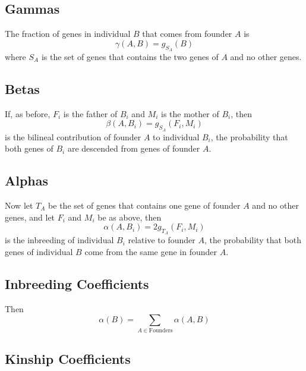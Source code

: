 \documentclass[11pt]{article}
\begin{document}
\subsection{Gammas}

The fraction of genes in individual $B$ that comes from founder $A$ is
\begin{equation} \label{eq:gamma}
   \gamma(A, B) = g_{S_A}(B)
\end{equation}
where $S_A$ is the set of genes that contains the two genes of $A$ and no
other genes.

\subsection{Betas}

If, as before, $F_i$ is the father of $B_i$ and $M_i$ is the mother of $B_i$,
then
\begin{equation} \label{eq:beta}
   \beta(A, B_i) = g_{S_A}(F_i, M_i)
\end{equation}
is the bilineal contribution of founder $A$ to individual $B_i$,
the probability that both genes of $B_i$ are descended from genes
of founder $A$.

\subsection{Alphas}

Now let $T_A$ be the set of genes that contains one gene of founder $A$ and no
other genes, and let $F_i$ and $M_i$ be as above, then
\begin{equation} \label{eq:alpha}
   \alpha(A, B_i) = 2 g_{T_A}(F_i, M_i)
\end{equation}
is the inbreeding of individual $B_i$ relative to founder $A$,
the probability that both genes of individual $B$ come from the same
gene in founder $A$.

\subsection{Inbreeding Coefficients}

Then
\begin{equation} \label{eq:inbreeding}
   \alpha(B) = \sum_{A \in \text{Founders}} \alpha(A, B)
\end{equation}

\subsection{Kinship Coefficients}
\end{document}
